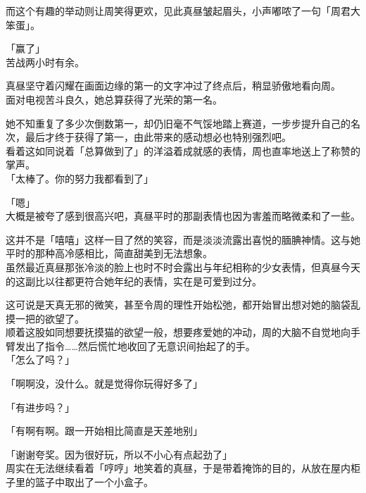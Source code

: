 而这个有趣的举动则让周笑得更欢，见此真昼皱起眉头，小声嘟哝了一句「周君大笨蛋」。\\

\vspace{2\baselineskip}

「赢了」\\

苦战两小时有余。

真昼坚守着闪耀在画面边缘的第一的文字冲过了终点后，稍显骄傲地看向周。\\

面对电视苦斗良久，她总算获得了光荣的第一名。

她不知重复了多少次倒数第一，却仍旧毫不气馁地踏上赛道，一步步提升自己的名次，最后才终于获得了第一，由此带来的感动想必也特别强烈吧。\\

看着这如同说着「总算做到了」的洋溢着成就感的表情，周也直率地送上了称赞的掌声。\\

「太棒了。你的努力我都看到了」

「嗯」\\

大概是被夸了感到很高兴吧，真昼平时的那副表情也因为害羞而略微柔和了一些。

这并不是「嘻嘻」这样一目了然的笑容，而是淡淡流露出喜悦的腼腆神情。这与她平时的那种高冷感相比，简直甜美到无法想象。\\

虽然最近真昼那张冷淡的脸上也时不时会露出与年纪相称的少女表情，但真昼今天的这副比以往都更符合她年纪的表情，实在是可爱到过分。

这可说是天真无邪的微笑，甚至令周的理性开始松弛，都开始冒出想对她的脑袋乱摸一把的欲望了。\\

顺着这股如同想要抚摸猫的欲望一般，想要疼爱她的冲动，周的大脑不自觉地向手臂发出了指令……然后慌忙地收回了无意识间抬起了的手。\\

「怎么了吗？」

「啊啊没，没什么。就是觉得你玩得好多了」

「有进步吗？」

「有啊有啊。跟一开始相比简直是天差地别」

「谢谢夸奖。因为很好玩，所以不小心有点起劲了」\\

周实在无法继续看着「哼哼」地笑着的真昼，于是带着掩饰的目的，从放在屋内柜子里的篮子中取出了一个小盒子。\\

